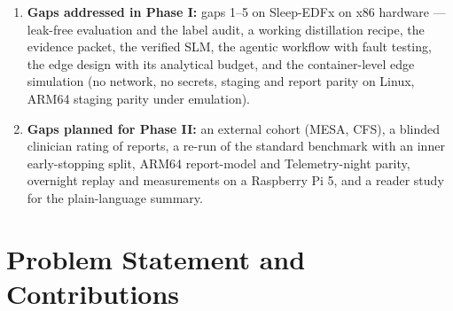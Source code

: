 \begin{enumerate}
  \item \textbf{Gaps addressed in Phase I:} gaps 1--5 on Sleep-EDFx on x86 hardware --- leak-free evaluation and
  the label audit, a working distillation recipe, the evidence packet, the verified SLM, the agentic workflow with
  fault testing, the edge design with its analytical budget, and the container-level edge simulation (no
  network, no secrets, staging and report parity on Linux, ARM64 staging parity under emulation).
  \item \textbf{Gaps planned for Phase II:} an external cohort (MESA, CFS), a blinded clinician rating of reports, a
  re-run of the standard benchmark with an inner early-stopping split, ARM64 report-model and Telemetry-night
  parity, overnight replay and measurements on a Raspberry Pi 5, and a reader study for the plain-language summary.
\end{enumerate}

\section{Problem Statement and Contributions}\label{sec:problem}

